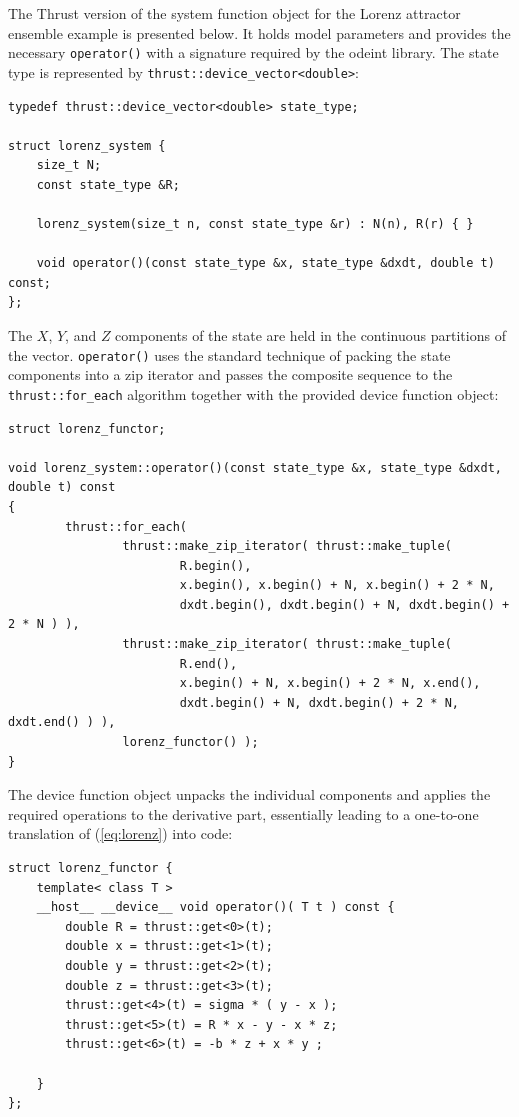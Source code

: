 \documentclass[final]{siamltex}
\newcommand{\code}[1]{\lstinline|#1|}
\newcommand{\eqref}[1]{(\ref{#1})}
\begin{document}
The Thrust version of the system function object for the Lorenz attractor ensemble
example is presented below. It holds model parameters and provides the necessary
\code{operator()} with a signature required by the odeint library. The state
type is represented by \code{thrust::device_vector<double>}:
\begin{lstlisting}
typedef thrust::device_vector<double> state_type;

struct lorenz_system {
    size_t N;
    const state_type &R;

    lorenz_system(size_t n, const state_type &r) : N(n), R(r) { }

    void operator()(const state_type &x, state_type &dxdt, double t) const;
};
\end{lstlisting}
The $X$, $Y$, and $Z$ components of the state are held in the continuous
partitions of the vector.  \code{operator()} uses the standard technique of
packing the state components into a zip iterator and passes the composite
sequence to the \code{thrust::for_each} algorithm together with the provided
device function object:
\begin{lstlisting}[firstnumber=12]
struct lorenz_functor;

void lorenz_system::operator()(const state_type &x, state_type &dxdt, double t) const
{
        thrust::for_each(
                thrust::make_zip_iterator( thrust::make_tuple(
                        R.begin(),
                        x.begin(), x.begin() + N, x.begin() + 2 * N,
                        dxdt.begin(), dxdt.begin() + N, dxdt.begin() + 2 * N ) ),
                thrust::make_zip_iterator( thrust::make_tuple(
                        R.end(),
                        x.begin() + N, x.begin() + 2 * N, x.end(),
                        dxdt.begin() + N, dxdt.begin() + 2 * N, dxdt.end() ) ),
                lorenz_functor() );
}
\end{lstlisting}
The device function object unpacks the individual components and applies the required
operations to the derivative part, essentially leading to a one-to-one
translation of \eqref{eq:lorenz} into code:
\begin{lstlisting}[firstnumber=last]
struct lorenz_functor {
    template< class T >
    __host__ __device__ void operator()( T t ) const {
        double R = thrust::get<0>(t);
        double x = thrust::get<1>(t);
        double y = thrust::get<2>(t);
        double z = thrust::get<3>(t);
        thrust::get<4>(t) = sigma * ( y - x );
        thrust::get<5>(t) = R * x - y - x * z;
        thrust::get<6>(t) = -b * z + x * y ;

    }
};
\end{lstlisting}
\end{document}
